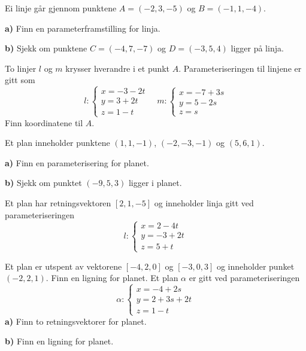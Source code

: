 



\eqlen	
\opgt
\setcounter{section}{1}	
Ei linje går gjennom punktene $ A=(-2, 3, -5) $ og $ B=(-1, 1, -4) $.\os

\textbf{a)}	Finn en parameterframstilling for linja.\os

\textbf{b)} Sjekk om punktene $ C=(-4, 7, -7) $ og $ D=(-3, 5, 4) $ ligger på linja.

To linjer $ l $ og $ m $ krysser hverandre i et punkt $ A $. Parameteriseringen til linjene er gitt som
\[l: \left\lbrace{
	\begin{array}{l}
	x=-3-2t  \\
	y= 3+ 2t   \\
	z= 1-t 
	\end{array}
}\right. \quad 
m: \left\lbrace{
	\begin{array}{l}
	x=-7 +3s  \\
	y= 5- 2s   \\
	z= s 
	\end{array}
}\right. \]
Finn koordinatene til $ A $.

Et plan inneholder punktene $ (1, 1,-1) $, $ (-2, -3, -1) $ og $ (5, 6, 1) $. \os

\textbf{a)} Finn en parameterisering for planet.\os

\textbf{b)} Sjekk om punktet $ (-9, 5, 3) $ ligger i planet.


Et plan har retningsvektoren $ [2, 1, -5] $ og inneholder linja gitt ved parameteriseringen
\[ l: \left\lbrace{
	\begin{array}{l}
	x=2-4t  \\
	y= -3+ 2t   \\
	z= 5+t 
	\end{array}
}\right. \]


\nes
{}
Et plan er utspent av vektorene $ [-4, 2, 0] $ og $ [-3, 0, 3] $ og inneholder punket $ (-2, 2, 1) $. Finn en ligning for planet.
\newpage
{}
Et plan $ \alpha $ er gitt ved parameteriseringen
\[\alpha: \left\lbrace{
	\begin{array}{l}
	x=-4 + 2s  \\
	y= 2+ 3s + 2t   \\
	z= 1-t 
	\end{array}
}\right. \]
\textbf{a)} Finn to retningsvektorer for planet.\os

\textbf{b)} Finn en ligning for planet.


